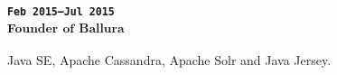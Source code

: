 \subsubsection{\textsubscript{\uppercase{\texttt{Feb 2015--Jul 2015}}\\
Founder of Ballura
}
}
Java SE, Apache Cassandra, Apache Solr and Java Jersey.
